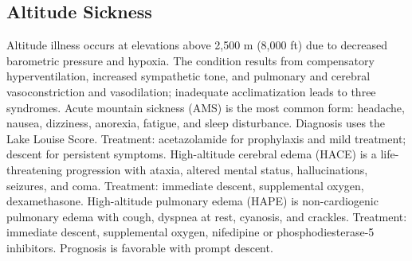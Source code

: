 






\label{sec:Environmental and Occupational Medicine}

\subsection{Altitude Sickness}
\label{sec:Altitude Sickness}
Altitude illness occurs at elevations above 2,500 m (8,000 ft) due to decreased barometric pressure and hypoxia. The condition results from compensatory hyperventilation, increased sympathetic tone, and pulmonary and cerebral vasoconstriction and vasodilation; inadequate acclimatization leads to three syndromes. Acute mountain sickness (AMS) is the most common form: headache, nausea, dizziness, anorexia, fatigue, and sleep disturbance. Diagnosis uses the Lake Louise Score. Treatment: acetazolamide for prophylaxis and mild treatment; descent for persistent symptoms. High-altitude cerebral edema (HACE) is a life-threatening progression with ataxia, altered mental status, hallucinations, seizures, and coma. Treatment: immediate descent, supplemental oxygen, dexamethasone. High-altitude pulmonary edema (HAPE) is non-cardiogenic pulmonary edema with cough, dyspnea at rest, cyanosis, and crackles. Treatment: immediate descent, supplemental oxygen, nifedipine or phosphodiesterase-5 inhibitors. Prognosis is favorable with prompt descent.

